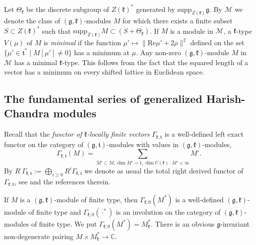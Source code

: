 \documentclass[11pt]{amsart}
\renewcommand{\tt}{\mathfrak{t}}
\newcommand{\kk}{\mathfrak{k}}
\renewcommand{\gg}{\mathfrak{g}}
\newcommand{\supp}{\mathrm{supp}}
\newcommand{\field}[1]{\mathbb{#1}}
\begin{document}
Let $\Theta_\kk$ be the discrete subgroup of $Z(\kk)^*$ generated by $\supp_{Z(\kk)}\gg$. By $\mathcal{M}$ we denote the class of $(\gg,\kk)$-modules $M$ for which there exists a finite subset $S\subset Z(\kk)^*$ such that $\supp_{Z(\kk)}M\subset(S+\Theta_\kk)$. If $M$ is a module in $\mathcal{M}$, a $\kk$-type $V(\mu)$ of $M$ is \textit{minimal} if the function $\mu '\mapsto \parallel\mathrm{Re}\mu '+2\rho \parallel^2 $ defined on the set $\{\mu '\in\tt^*\; |\; M[\mu ']\neq 0\}$ has a minimum at $\mu$. Any non-zero $(\gg,\kk)$-module $M$ in $\mathcal{M}$ has a minimal $\kk$-type. This follows from the fact that the squared length of a vector has a minimum on every shifted lattice in Euclidean space.

\subsection{The fundamental series of generalized Harish-Chandra modules}

Recall that the \textit{functor of $\kk$-locally finite vectors} $\Gamma_{\kk,\tt}$ is a well-defined left exact functor on the category of $(\gg,\tt)$-modules with values in $(\gg,\kk)$-modules, $$\Gamma_{\kk,\tt}(M)=\sum_{M'\subset M, \dim M'=1, \dim U(\kk)\cdot M'<\infty}M'.$$ By $R^\cdot\Gamma_{\kk,\tt}:=\bigoplus_{i\geq 0}R^i\Gamma_{\kk,\tt}$ we denote as usual the total right derived functor of $\Gamma_{\kk,\tt}$, see \cite{PZ1} and the references therein.

If $M$ is a $(\gg,\kk)$-module of finite type, then $\Gamma_{\kk,0}(M^*)$ is a well-defined $(\gg,\kk)$-module of finite type and $\Gamma_{\kk,0}(\cdot^*)$ is an involution on the category of $(\gg,\kk)$-modules of finite type. We put $\Gamma_{\kk,0}(M^*)=M_\kk^*$. There is an obvious $\gg$-invariant non-degenerate pairing $M\times M_\kk^*\rightarrow\field{C}$.
\end{document}
